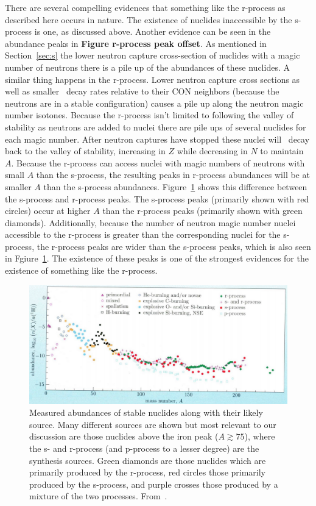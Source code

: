 { There are several compelling evidences that something like the
 r-process as described here occurs in nature.  The existence of
 nuclides inaccessible by the s-process is one, as discussed above.  
Another evidence  can be seen in
the abundance peaks in {\bf Figure r-process peak offset}.  As
mentioned in Section~\ref{sec:s} 
the lower neutron capture cross-section of nuclides with a magic
number of neutrons there is a pile up of the abundances of these
nuclides.   A similar thing happens in the r-process.  Lower neutron
 capture cross sections as well as smaller \bminus\ decay rates
 relative to their CON neighbors
 (because the neutrons are in a stable configuration) causes a pile up
 along the neutron magic number isotones. Because the r-process isn't limited to
 following the valley of stability as neutrons are added to nuclei
 there are pile ups of several nuclides for each magic number.  After
 neutron captures have stopped these nuclei will \bminus\ decay back
 to the valley of stability, increasing in $Z$ while decreasing in $N$
 to maintain $A$.  Because the r-process can access nuclei with magic
 numbers of neutrons with small $A$ than the s-process, the resulting
 peaks in r-process abundances will be at smaller $A$ than the
 s-process abundances. Figure~\ref{fig:peaks} shows this difference
 between the s-process and r-process peaks.  The s-process peaks
 (primarily shown with red circles)  occur at
 higher $A$ than the r-process peaks (primarily shown with green
 diamonds).  
Additionally, because the number of neutron magic
number nuclei accessible to the r-process is greater than the
corresponding nuclei for the s-process, the r-process peaks are wider
than the s-process peaks, which is also seen in
 Fgiure~\ref{fig:peaks}.  
The existence of these peaks is one of the
strongest evidences for the existence of something like the r-process.
\begin{figure}
\centering
\includegraphics[width=6in]{pdf/peaks.png}
\caption{\label{fig:peaks} Measured abundances of stable nuclides
 along with their likely source.  Many different sources are shown but
 most relevant to our discussion are those nuclides above the iron
 peak
 ($A\gtrsim75$),
 where the s- and r-process (and p-process to a lesser degree) are the
 synthesis sources.  Green diamonds are those nuclides which are
 primarily produced by the r-process, red circles those primarily
 produced by the s-process, and purple crosses those produced by a
 mixture of the two processes.  From~\cite{ryan2010}.}
\end{figure}

}
